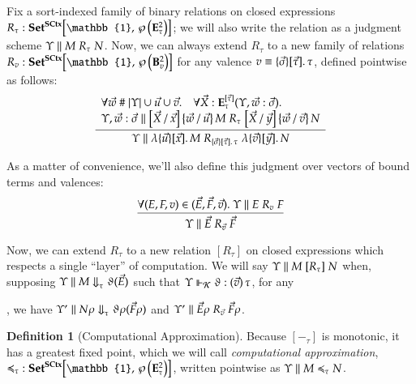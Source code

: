 \documentclass[11pt]{article}
\theoremstyle{definition}
\newtheorem{definition}[thm]{Definition}
\theoremstyle{remark}
\numberwithin{equation}{section}
\def\IModeColorName{MidnightBlue}
\def\OModeColorName{Maroon}
\def\IModeColorName{Black}
\def\OModeColorName{Black}
\newcommand\IMode[1]{{\color{\IModeColorName}{#1}}}
\newcommand\OMode[1]{{\color{\OModeColorName}{#1}}}
\newcommand\Member[2]{\IMode{#1}\in\IMode{#2}}
\newcommand\Of[2]{\IMode{#1}: \IMode{#2}}
\newcommand\MkValence[3]{%
  \ifthenelse{\equal{#1}{}}{}{%
    \{#1\}%
  }%
  \ifthenelse{\equal{#2}{}}{}{%
    [#2]%
  }.\, #3%
}
\newcommand\MkBTm[3]{\mathbb{\lambda}\{#1\}[#2].\, #3}
\newcommand\MkArity[2]{(#1)\, #2}
\newcommand\Match[2]{\IMode{#1}\equiv\OMode{#2}}
\newcommand\CanOperators{\mathcal{K}}
\newcommand\Sets{\mathbf{Set}}
\newcommand\SCtx{\mathbf{SCtx}}
\newcommand\App[2]{#1(#2)}
\newcommand\Dom[1]{\left\vert#1\right\vert}
\newcommand\Hom[3]{#1\!\left[#2,\,#3\right]}
\newcommand\Rename[3]{%
  \left\{#1\, /\, #2\right\}#3%
}
\newcommand\Subst[3]{%
  \left[#1\, /\, #2\right]#3%
}
\newcommand\Pow[1]{\wp\left(#1\right)}
\newcommand\EvalN[5]{\IMode{#1}\parallel\IMode{#4}\Downarrow^{\OMode{#3}}_{\IMode{#2}}\OMode{#5}}
\newcommand\Eval[4]{\EvalN{#1}{#2}{}{#3}{#4}}
\newcommand\Exprs{\mathbf{E}}
\newcommand\BTms{\mathbf{B}}
\begin{document}
Fix a sort-indexed family of binary relations on closed expressions
$\Of{R_\tau}{\Hom{\Sets^{\SCtx}}{\mathbb{1}}{\Pow{\Exprs_\tau^2}}}$; we will
also write the relation as a judgment scheme
$\SBinRel{R_\tau}{\Upsilon}{M}{N}$. Now, we can always extend $R_\tau$ to a new
family of relations
$\Of{R_v}{\Hom{\Sets^{\SCtx}}{\mathbb{1}}{\Pow{\BTms_v^2}}}$ for any valence
$\Match{v}{\MkValence{\vec{\sigma}}{\vec{\tau}}{\tau}}$, defined pointwise as
follows:
\[
  \infer{
    \SBinRel{R_{\MkValence{\vec{\sigma}}{\vec{\tau}}{\tau}}}{\Upsilon}{
      \MkBTm{\vec{u}}{\vec{x}}{M}
    }{
      \MkBTm{\vec{v}}{\vec{y}}{N}
    }
  }{
    \begin{array}{l}
      \forall\IMode{\vec{w}}\mathrel{\#}\IMode{\Dom{\Upsilon}\cup\vec{u}\cup\vec{v}}.\quad
      \forall\Of{\vec{X}}{\Exprs_\tau^{[\vec{\tau}]}(\Upsilon,\vec{w}:\vec{\sigma})}.\\
      \SBinRel{R_\tau}{\Upsilon,\vec{w}:\vec{\sigma}}{
        \Subst{\vec{X}}{\vec{x}}{\Rename{\vec{w}}{\vec{u}}{M}}
      }{
        \Subst{\vec{X}}{\vec{y}}{\Rename{\vec{w}}{\vec{v}}{N}}
      }
    \end{array}
  }
\]

As a matter of convenience, we'll also define this judgment over vectors of bound terms and valences:
\[
  \infer{
    \SBinRel{R_{\vec{v}}}{\Upsilon}{\vec{E}}{\vec{F}}
  }{
    \forall\Member{(E,F,v)}{(\vec{E},\vec{F},\vec{v})}.\
    \SBinRel{R_v}{\Upsilon}{E}{F}
  }
\]

Now, we can extend $R_\tau$ to a new relation $[R_\tau]$ on closed expressions
which respects a single ``layer'' of computation. We will say
$\SBinRel{[R_\tau]}{\Upsilon}{M}{N}$ when, supposing
$\Eval{\Upsilon}{\tau}{M}{\App{\vartheta}{\Vec{E}}}$ such that
$\IMode{\Upsilon}\Vdash_{\IMode{\CanOperators}}\IMode{\vartheta}:\OMode{\MkArity{\vec{v}}{\tau}}$,
for any
,
we have $\Eval{\Upsilon'}{\tau}{N\rho}{\App{\vartheta\rho}{\Vec{F}\rho}}$ and
$\SBinRel{R_{\vec{v}}}{\Upsilon'}{\vec{E}\rho}{\vec{F}\rho}$.

\begin{definition}[Computational Approximation]
Because $[-_\tau]$ is monotonic, it has a greatest fixed point, which we will
call \emph{computational approximation},
$\Of{\preccurlyeq_\tau}{\Hom{\Sets^\SCtx}{\mathbb{1}}{\Pow{\Exprs_\tau^2}}}$,
written pointwise as $\SBinRel{\preccurlyeq_\tau}{\Upsilon}{M}{N}$.
\end{definition}
\end{document}

